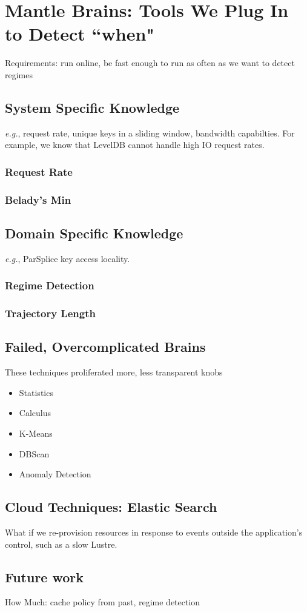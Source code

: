 \section{Mantle Brains: Tools We Plug In to Detect ``when"}

Requirements: run online, be fast enough to run as often as we want to detect
regimes

\subsection{System Specific Knowledge}

{\it e.g.}, request rate, unique keys in a sliding window, bandwidth
capabilties. For example, we know that LevelDB cannot handle high IO request
rates.

\subsubsection{Request Rate}

\subsubsection{Belady's Min}

\subsection{Domain Specific Knowledge}

{\it e.g.}, ParSplice key access locality.

\subsubsection{Regime Detection}
\subsubsection{Trajectory Length}

\subsection{Failed, Overcomplicated Brains}
These techniques proliferated more, less transparent knobs
\begin{itemize}
  \item Statistics
  \item Calculus
  \item K-Means
  \item DBScan
  \item Anomaly Detection
\end{itemize}


\subsection{Cloud Techniques: Elastic Search}

What if we re-provision resources in response to events outside the
application's control, such as a slow Lustre.

\subsection{Future work}

How Much: cache policy from past, regime detection

